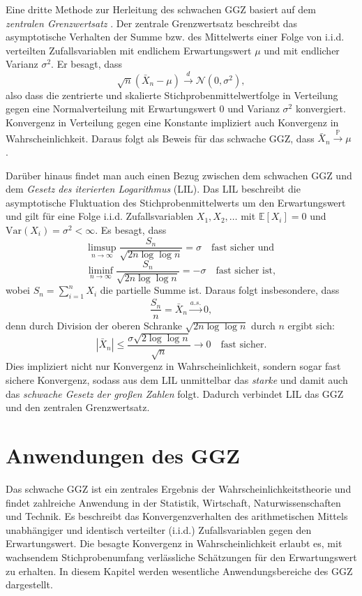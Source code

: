 \documentclass[12pt,a4paper]{article}
\begin{document}
Eine dritte Methode zur Herleitung des schwachen GGZ basiert auf dem \textit{zentralen Grenzwertsatz} \citep{walz2001}. Der zentrale Grenzwertsatz beschreibt das asymptotische Verhalten der Summe bzw. des Mittelwerts einer Folge von i.i.d. verteilten Zufallsvariablen mit endlichem Erwartungswert \( \mu \) und mit endlicher Varianz \( \sigma^2 \). Er besagt, dass
\[
\sqrt{n} \left( \bar{X}_n - \mu \right) \xrightarrow{d} \mathcal{N}(0, \sigma^2),
\]
also dass die zentrierte und skalierte Stichprobenmittelwertfolge in Verteilung gegen eine Normalverteilung mit Erwartungswert 0 und Varianz \( \sigma^2 \) konvergiert. Konvergenz in Verteilung gegen eine Konstante impliziert auch Konvergenz in Wahrscheinlichkeit. Daraus folgt als Beweis für das schwache GGZ, dass \( \bar{X}_n \xrightarrow{\mathbb{P}} \mu \) \citep{degroot2021}.


Darüber hinaus findet man auch einen Bezug zwischen dem schwachen GGZ und dem \textit{Gesetz des iterierten Logarithmus} (LIL). Das LIL beschreibt die asymptotische Fluktuation des Stichprobenmittelwerts um den Erwartungswert und gilt für eine Folge i.i.d. Zufallsvariablen \( X_1, X_2, \dots \) mit \( \mathbb{E}[X_i] = 0 \) und \( \text{Var}(X_i) = \sigma^2 < \infty \). Es besagt, dass
\[
\limsup_{n \to \infty} \frac{S_n}{\sqrt{2n \log \log n}} = \sigma \quad \text{fast sicher und }
\]
\[
\liminf_{n \to \infty} \frac{S_n}{\sqrt{2n \log \log n}} = -\sigma \quad \text{fast sicher ist},
\]
wobei \( S_n = \sum_{i=1}^n X_i \) die partielle Summe ist. Daraus folgt insbesondere, dass
\[
\frac{S_n}{n} = \bar{X}_n \xrightarrow{a.s.} 0,
\]
denn durch Division der oberen Schranke \( \sqrt{2n \log \log n} \) durch \( n \) ergibt sich:
\[
\left| \bar{X}_n \right| \leq \frac{\sigma \sqrt{2 \log \log n}}{\sqrt{n}} \to 0 \quad \text{fast sicher}.
\]
Dies impliziert nicht nur Konvergenz in Wahrscheinlichkeit, sondern sogar fast sichere Konvergenz, sodass aus dem LIL unmittelbar das \textit{starke} und damit auch das \textit{schwache Gesetz der großen Zahlen} folgt.
Dadurch verbindet LIL das GGZ und den zentralen Grenzwertsatz.


\section{Anwendungen des GGZ}
\label{sec:anwendung}


Das schwache GGZ ist ein zentrales Ergebnis der Wahrscheinlichkeitstheorie und findet zahlreiche Anwendung in der Statistik, Wirtschaft, Naturwissenschaften und Technik.
Es beschreibt das Konvergenzverhalten des arithmetischen Mittels unabhängiger und identisch verteilter (i.i.d.) Zufallsvariablen gegen den Erwartungswert. Die besagte Konvergenz in Wahrscheinlichkeit erlaubt es, mit wachsendem Stichprobenumfang verlässliche Schätzungen für den Erwartungswert zu erhalten. In diesem Kapitel werden wesentliche Anwendungsbereiche des GGZ dargestellt.
\end{document}
